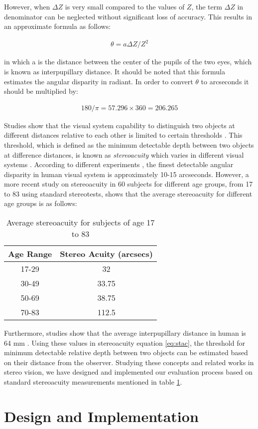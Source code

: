 \documentclass[12pt]{report}
\begin{document}
However, when $\Delta Z$ is very small compared to the values of $Z$, the term $\Delta Z$ in denominator can be neglected without significant loss of accuracy. This results in
an approximate formula as follows:

\begin{align}
\label{eq:stac}
\theta = a \Delta Z/Z^{2}
\end{align}

in which a is the distance between the center of the pupils of the two eyes, which is known as interpupillary distance.
It should be noted that this formula estimates the angular disparity in radiant. In order to convert $\theta$ to arcseconds it should be multiplied by:

\begin{align}
180/\pi = 57.296\times360=206.265
\end{align}

Studies show that the visual system capability to distinguish two objects at different distances relative to each other is limited to certain thresholds \cite{binr83,how95}.
This threshold, which is defined as the minimum detectable depth between two 
objects at difference distances, is known as {\it stereoacuity} which varies in different visual systems \cite{binr83,how95}. According to different
experiments \cite{binr83}, the finest detectable angular disparity in human visual system is approximately 10-15 arcseconds. However, a more recent study on
stereoacuity in 60 subjects \cite{garn06} for different age groups, from 17 to 83 using standard stereotests, 
shows that the average stereoacuity for different age groups is as follows:
\begin{table}[h!]
\begin{center}
\begin{tabular}{ |c|c| }
\hline
\textbf{Age Range} & \textbf{Stereo Acuity (arcsecs)} \\ \hline
17-29 & 32 \\  \hline
30-49 & 33.75 \\ \hline
50-69 & 38.75 \\ \hline
70-83 & 112.5 \\ \hline
\end{tabular}
\end{center}
\caption{Average stereoacuity for subjects of age 17 to 83}
\label{tab:stAcAge}
\end{table}

Furthermore, studies show that the average interpupillary distance in human is 64 mm \cite{how95}. 
Using these values in stereoacuity equation \ref{eq:stac}, the threshold for minimum detectable relative depth 
between two objects can be estimated based on their distance from the observer. 
Studying these concepts and related works in stereo vision, we have designed and implemented our evaluation process based on standard
stereoacuity measurements mentioned in table \ref{tab:stAcAge}.

\chapter{Design and Implementation}


 
\end{document}
